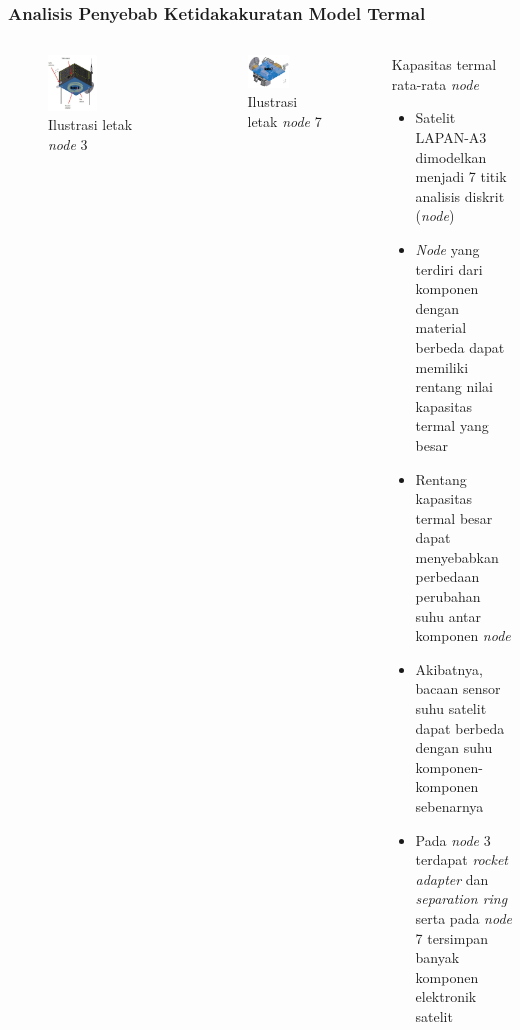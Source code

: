 \documentclass[8pt]{beamer}
\begin{document}
\begin{frame}
  \frametitle{Analisis Penyebab Ketidakakuratan Model Termal}
  \begin{columns}[T]
      \begin{figure}
          \includegraphics[width=0.5\textwidth]{figure/node3.png}
            \caption{Ilustrasi letak \textit{node} 3}
      \end{figure}
      \begin{figure}
          \includegraphics[width=0.5\textwidth]{figure/node7.png}
            \caption{Ilustrasi letak \textit{node} 7}
      \end{figure}
    \begin{block}{\center \normalsize Kapasitas termal rata-rata \textit{node}}
      \begin{itemize}
        \item Satelit LAPAN-A3 dimodelkan menjadi 7 titik analisis diskrit (\textit{node})
      \item \textit{Node} yang terdiri dari komponen dengan material berbeda dapat memiliki rentang nilai kapasitas termal yang besar
      \item Rentang kapasitas termal besar dapat menyebabkan perbedaan perubahan suhu antar komponen \textit{node}
      \item Akibatnya, bacaan sensor suhu satelit dapat berbeda dengan suhu komponen-komponen sebenarnya
      \item Pada \textit{node} 3 terdapat \textit{rocket adapter} dan \textit{separation ring} serta pada \textit{node} 7 tersimpan banyak komponen elektronik satelit
      \end{itemize}
    \end{block}
  \end{columns}
\end{frame}
\end{document}

